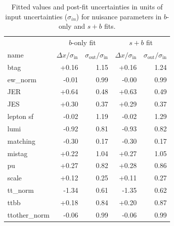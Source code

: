 \begin{table}[ht!]
\centering
\begin{tabular}{|l|r|r|r|r|} \hline 
&  \multicolumn{2}{c|}{$b$-only fit } & \multicolumn{2}{c|}{$s+b$ fit} \\ 
name  &  $\Delta x/\sigma_{\text{in}}$ & $\sigma_{\text{out}}/\sigma_{\text{in}}$ & $\Delta x/\sigma_{\text{in}}$ &$\sigma_{\text{out}}/\sigma_{\text{in}}$  \\  \hline
btag                        &   +0.16 &  1.15 &   +0.16 & 1.24  \\
ew\_norm               &    -0.01 &  0.99 &   -0.00  & 0.99  \\
JER                           &    +0.64 &  0.48 &  +0.63 & 0.49  \\
JES                          &    +0.30 &  0.37 &  +0.29  & 0.37  \\
lepton sf                  &    -0.02  &  1.19 &  -0.02  & 1.29  \\
lumi                        &    -0.92  &  0.81 &  -0.93  & 0.82  \\
matching                &    -0.30  &  0.17 &   -0.30 & 0.17  \\
mistag                    &    +0.22  & 1.04 &  +0.27 & 1.05  \\
pu                           &    +0.27 &  0.82 &  +0.28 & 0.86  \\
scale                      &     +0.12 &  0.25 &  +0.11 & 0.27  \\
tt\_norm                 &     -1.34  &  0.61 &  -1.35  & 0.62 \\
ttbb                        &      +0.18 &  0.84 & +0.20 & 0.87  \\
ttother\_norm         &     -0.06   & 0.99 &  -0.06 & 0.99  \\
\hline
\end{tabular}
\caption{Fitted values and post-fit uncertainties in units of input uncertainties ($\sigma_{in}$) for nuisance parameters in $b$-only and $s+b$ fits.}
\label{tab:nuisBSB}
\end{table}



